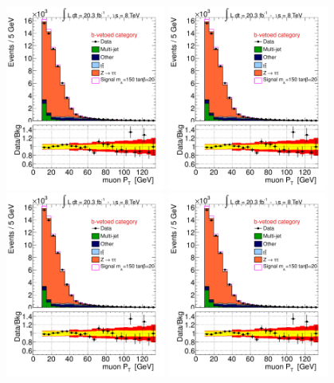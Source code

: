 \begin{figure}[!h]
     \begin{center}
	
            \includegraphics[page=3, width=0.47\textwidth]{figure/final_plots/Bveto_final.pdf}
            \includegraphics[page=4, width=0.47\textwidth]{figure/final_plots/Bveto_final.pdf}
            \includegraphics[page=6, width=0.47\textwidth]{figure/final_plots/Bveto_final.pdf}
            \includegraphics[page=9, width=0.47\textwidth]{figure/final_plots/Bveto_final.pdf}

\end{center}
\end{figure}
